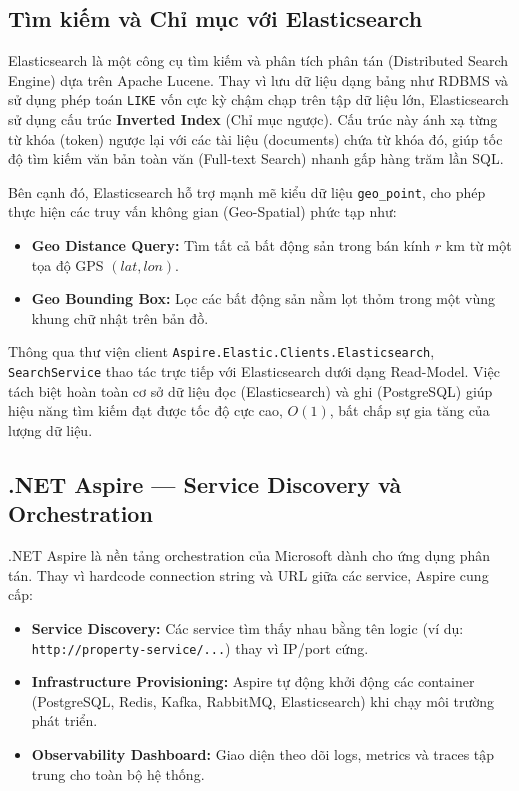 \subsection{Tìm kiếm và Chỉ mục với Elasticsearch}
\label{subsec:geo_search}

Elasticsearch là một công cụ tìm kiếm và phân tích phân tán (Distributed Search Engine) dựa trên Apache Lucene.
Thay vì lưu dữ liệu dạng bảng như RDBMS và sử dụng phép toán \texttt{LIKE} vốn cực kỳ chậm chạp trên tập dữ liệu lớn,
Elasticsearch sử dụng cấu trúc \textbf{Inverted Index} (Chỉ mục ngược). Cấu trúc này ánh xạ từng từ khóa (token)
ngược lại với các tài liệu (documents) chứa từ khóa đó, giúp tốc độ tìm kiếm văn bản toàn văn (Full-text Search)
nhanh gấp hàng trăm lần SQL.

Bên cạnh đó, Elasticsearch hỗ trợ mạnh mẽ kiểu dữ liệu \texttt{geo\_point}, cho phép thực hiện các truy vấn
không gian (Geo-Spatial) phức tạp như:
\begin{itemize}
    \item \textbf{Geo Distance Query:} Tìm tất cả bất động sản trong bán kính $r$ km từ một tọa độ GPS $(lat, lon)$.
    \item \textbf{Geo Bounding Box:} Lọc các bất động sản nằm lọt thỏm trong một vùng khung chữ nhật trên bản đồ.
\end{itemize}
Thông qua thư viện client \texttt{Aspire.Elastic.Clients.Elasticsearch}, \texttt{SearchService} thao tác trực tiếp với
Elasticsearch dưới dạng Read-Model. Việc tách biệt hoàn toàn cơ sở dữ liệu đọc (Elasticsearch) và ghi (PostgreSQL)
giúp hiệu năng tìm kiếm đạt được tốc độ cực cao, $O(1)$, bất chấp sự gia tăng của lượng dữ liệu.

\subsection{.NET Aspire — Service Discovery và Orchestration}
\label{subsec:aspire}

.NET Aspire là nền tảng orchestration của Microsoft dành cho ứng dụng phân tán. Thay vì
hardcode connection string và URL giữa các service, Aspire cung cấp:

\begin{itemize}
    \item \textbf{Service Discovery:} Các service tìm thấy nhau bằng tên logic
    (ví dụ: \texttt{http://property-service/...}) thay vì IP/port cứng.
    \item \textbf{Infrastructure Provisioning:} Aspire tự động khởi động các container
    (PostgreSQL, Redis, Kafka, RabbitMQ, Elasticsearch) khi chạy môi trường phát triển.
    \item \textbf{Observability Dashboard:} Giao diện theo dõi logs, metrics và traces
    tập trung cho toàn bộ hệ thống.
\end{itemize}

